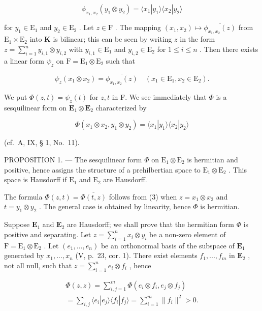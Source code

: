 \[
\phi_ {x _ {1}, x _ {2}} (y _ {1} \otimes y _ {2}) = \langle x _ {1} | y _ {1} \rangle \langle x _ {2} | y _ {2} \rangle\tag{1}
\]

for \(y_{1} \in \mathrm{E}_{1}\) and \(y_{2} \in \mathrm{E}_{2}\) . Let \(z \in \mathrm{F}\) . The mapping \((x_{1}, x_{2}) \mapsto \overline{\phi_{x_{1},x_{2}}(z)}\) from \(\mathrm{E}_1 \times \mathrm{E}_2\) into \(\mathbf{K}\) is bilinear; this can be seen by writing \(z\) in the form \(z = \sum_{i=1}^{n} y_{i,1} \otimes y_{i,2}\) with \(y_{i,1} \in \mathrm{E}_1\) and \(y_{i,2} \in \mathrm{E}_2\) for \(1 \leqslant i \leqslant n\) . Then there exists a linear form \(\psi_z\) on \(\mathrm{F} = \mathrm{E}_1 \otimes \mathrm{E}_2\) such that

\[
\psi_ {z} (x _ {1} \otimes x _ {2}) = \overline {{\phi_ {x _ {1} , x _ {2}} (z)}} \quad (x _ {1} \in \mathrm{E} _ {1}, x _ {2} \in \mathrm{E} _ {2}).\tag{2}
\]

We put \(\Phi(z, t) = \psi_z(t)\) for \(z, t\) in F. We see immediately that \(\Phi\) is a sesquilinear form on \(\mathbf{E}_1 \otimes \mathbf{E}_2\) characterized by

\[
\Phi (x _ {1} \otimes x _ {2}, y _ {1} \otimes y _ {2}) = \langle x _ {1} | y _ {1} \rangle \langle x _ {2} | y _ {2} \rangle\tag{3}
\]

(cf.~A, IX, § 1, No.~11).

PROPOSITION 1. --- The sesquilinear form \(\Phi\) on \(\mathrm{E}_1 \otimes \mathrm{E}_2\) is hermitian and positive, hence assigns the structure of a prehilbertian space to \(\mathrm{E}_1 \otimes \mathrm{E}_2\) . This space is Hausdorff if \(\mathrm{E}_1\) and \(\mathrm{E}_2\) are Hausdorff.

The formula \(\Phi(z, t) = \overline{\Phi(t, z)}\) follows from (3) when \(z = x_1 \otimes x_2\) and \(t = y_1 \otimes y_2\) . The general case is obtained by linearity, hence \(\Phi\) is hermitian.

Suppose \(\mathbf{E}_1\) and \(\mathbf{E}_2\) are Hausdorff; we shall prove that the hermitian form \(\Phi\) is positive and separating. Let \(z = \sum_{i=1}^{n} x_i \otimes y_i\) be a non-zero element of \(\mathrm{F} = \mathrm{E}_1 \otimes \mathrm{E}_2\) . Let \((e_1, ..., e_n)\) be an orthonormal basis of the subspace of \(\mathbf{E}_1\) generated by \(x_1, ..., x_n\) (V, p.~23, cor. 1). There exist elements \(f_1, ..., f_m\) in \(\mathbf{E}_2\) , not all null, such that \(z = \sum_{i=1}^{n} e_i \otimes f_i\) , hence

\[
\begin{array}{l} \Phi (z, z) = \sum_ {i, j = 1} ^ {m} \Phi (e _ {i} \otimes f _ {i}, e _ {j} \otimes f _ {j}) \\ = \sum_ {i, j} \langle e _ {i} | e _ {j} \rangle \langle f _ {i} | f _ {j} \rangle = \sum_ {i = 1} ^ {m} \| f _ {i} \| ^ {2} > 0. \end{array}
\]

